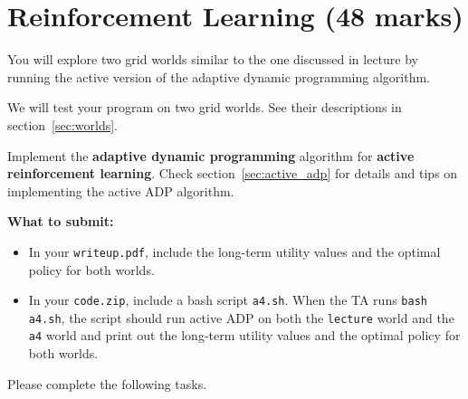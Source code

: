\documentclass[12pt]{article}
\begin{document}
\newpage
\section{Reinforcement Learning (48 marks)}

You will explore two grid worlds similar to the one discussed in lecture by running the active version of the adaptive dynamic programming algorithm.

We will test your program on two grid worlds. See their descriptions in section~\ref{sec:worlds}.

Implement the {\bf adaptive dynamic programming} algorithm for {\bf active reinforcement learning}. Check section~\ref{sec:active_adp} for details and tips on implementing the active ADP algorithm.

{\bf What to submit:}

\begin{itemize}
\item In your \verb+writeup.pdf+, include the long-term utility values and the optimal policy for both worlds. 

\item In your \verb+code.zip+, include a bash script \verb+a4.sh+. When the TA runs \verb+bash a4.sh+, the script should run active ADP on both the \verb+lecture+ world and the \verb+a4+ world and print out the long-term utility values and the optimal policy for both worlds.
\end{itemize}

Please complete the following tasks.
\end{document}
